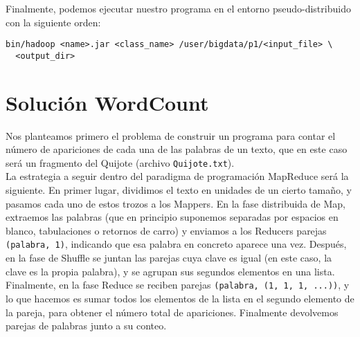 \documentclass[11pt]{article}
\begin{document}
Finalmente, podemos ejecutar nuestro programa en el entorno pseudo-distribuido con la siguiente orden:

\begin{verbatim}
bin/hadoop <name>.jar <class_name> /user/bigdata/p1/<input_file> \
  <output_dir>
\end{verbatim}

\section{Solución WordCount}

Nos planteamos primero el problema de construir un programa para contar el número de apariciones de cada una de las palabras de un texto, que en este caso será un fragmento del Quijote (archivo \verb|Quijote.txt|).\\

La estrategia a seguir dentro del paradigma de programación MapReduce será la siguiente. En primer lugar, dividimos el texto en unidades de un cierto tamaño, y pasamos cada uno de estos trozos a los Mappers. En la fase distribuida de Map, extraemos las palabras (que en principio suponemos separadas por espacios en blanco, tabulaciones o retornos de carro) y enviamos a los Reducers parejas \verb|(palabra, 1)|, indicando que esa palabra en concreto aparece una vez. Después, en la fase de Shuffle se juntan las parejas cuya clave es igual (en este caso, la clave es la propia palabra), y se agrupan sus segundos elementos en una lista. Finalmente, en la fase Reduce se reciben parejas \verb|(palabra, (1, 1, 1, ...))|, y lo que hacemos es sumar todos los elementos de la lista en el segundo elemento de la pareja, para obtener el número total de apariciones. Finalmente devolvemos parejas de palabras junto a su conteo.
\end{document}
